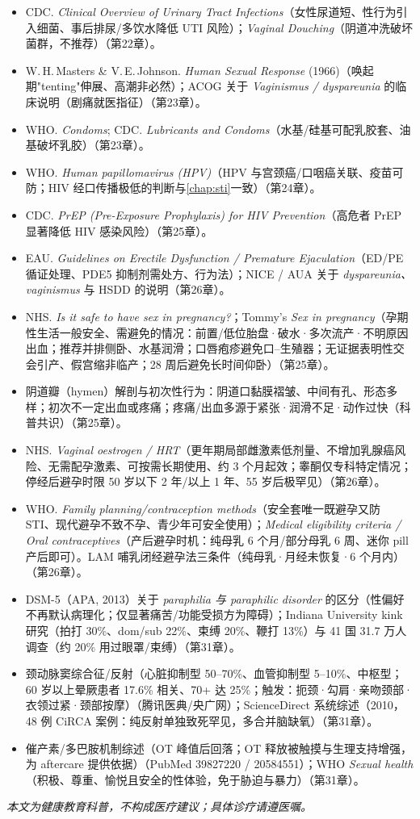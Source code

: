 \documentclass[12pt,UTF8,openany]{ctexbook}
\begin{document}
\begin{itemize}[leftmargin=2em]
  \item CDC. \emph{Clinical Overview of Urinary Tract Infections}（女性尿道短、性行为引入细菌、事后排尿/多饮水降低 UTI 风险）；\emph{Vaginal Douching}（阴道冲洗破坏菌群，不推荐）（第22章）。
  \item W.\,H.\,Masters \& V.\,E.\,Johnson. \emph{Human Sexual Response} (1966)（唤起期"tenting"伸展、高潮非必然）；ACOG 关于 \emph{Vaginismus / dyspareunia} 的临床说明（剧痛就医指征）（第23章）。
  \item WHO. \emph{Condoms}; CDC. \emph{Lubricants and Condoms}（水基/硅基可配乳胶套、油基破坏乳胶）（第23章）。
  \item WHO. \emph{Human papillomavirus (HPV)}（HPV 与宫颈癌/口咽癌关联、疫苗可防；HIV 经口传播极低的判断与\ref{chap:sti}一致）（第24章）。
  \item CDC. \emph{PrEP (Pre-Exposure Prophylaxis) for HIV Prevention}（高危者 PrEP 显著降低 HIV 感染风险）（第25章）。
  \item EAU. \emph{Guidelines on Erectile Dysfunction / Premature Ejaculation}（ED/PE 循证处理、PDE5 抑制剂需处方、行为法）；NICE / AUA 关于 \emph{dyspareunia、vaginismus} 与 HSDD 的说明（第26章）。
  \item NHS. \emph{Is it safe to have sex in pregnancy?}；Tommy's \emph{Sex in pregnancy}（孕期性生活一般安全、需避免的情况：前置/低位胎盘·破水·多次流产·不明原因出血；推荐并排侧卧、水基润滑；口唇疱疹避免口--生殖器；无证据表明性交会引产、假宫缩非临产；28 周后避免长时间仰卧）（第25章）。
  \item 阴道瓣（hymen）解剖与初次性行为：阴道口黏膜褶皱、中间有孔、形态多样；初次不一定出血或疼痛；疼痛/出血多源于紧张·润滑不足·动作过快（科普共识）（第25章）。
  \item NHS. \emph{Vaginal oestrogen / HRT}（更年期局部雌激素低剂量、不增加乳腺癌风险、无需配孕激素、可按需长期使用、约 3 个月起效；睾酮仅专科特定情况；停经后避孕时限 50 岁以下 2 年/以上 1 年、55 岁后极罕见）（第26章）。
  \item WHO. \emph{Family planning/contraception methods}（安全套唯一既避孕又防 STI、现代避孕不致不孕、青少年可安全使用）；\emph{Medical eligibility criteria / Oral contraceptives}（产后避孕时机：纯母乳 6 个月/部分母乳 6 周、迷你 pill 产后即可）。LAM 哺乳闭经避孕法三条件（纯母乳·月经未恢复·6 个月内）（第26章）。
  \item DSM-5（APA, 2013）关于 \emph{paraphilia 与 paraphilic disorder} 的区分（性偏好不再默认病理化；仅显著痛苦/功能受损方为障碍）；Indiana University kink 研究（拍打 30\%、dom/sub 22\%、束缚 20\%、鞭打 13\%）与 41 国 31.7 万人调查（约 20\% 用过眼罩/束缚）（第31章）。
  \item 颈动脉窦综合征/反射（心脏抑制型 50--70\%、血管抑制型 5--10\%、中枢型；60 岁以上晕厥患者 17.6\% 相关、70+ 达 25\%；触发：扼颈·勾肩·亲吻颈部·衣领过紧·颈部按摩）（腾讯医典/央广网）；ScienceDirect 系统综述（2010，48 例 CiRCA 案例：纯反射单独致死罕见，多合并脑缺氧）（第31章）。
  \item 催产素/多巴胺机制综述（OT 峰值后回落；OT 释放被触摸与生理支持增强，为 aftercare 提供依据）（PubMed 39827220 / 20584551）；WHO \emph{Sexual health}（积极、尊重、愉悦且安全的性体验，免于胁迫与暴力）（第31章）。
\end{itemize}

\begin{center}
\itshape 本文为健康教育科普，不构成医疗建议；具体诊疗请遵医嘱。
\end{center}

\clearpage
\end{document}
